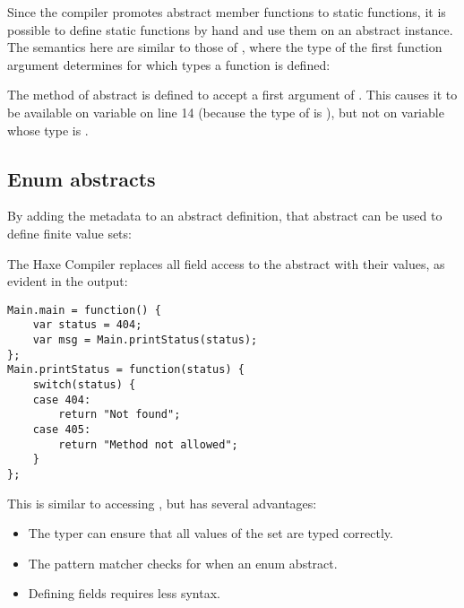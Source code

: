 Since the compiler promotes abstract member functions to static functions, it is possible to define static functions by hand and use them on an abstract instance. The semantics here are similar to those of , where the type of the first function argument determines for which types a function is defined:

The method  of abstract  is defined to accept a first argument of . This causes it to be available on variable  on line 14 (because the type of  is ), but not on variable  whose type is .



\subsection{Enum abstracts}
\label{types-abstract-enum}

By adding the  metadata to an abstract definition, that abstract can be used to define finite value sets:


The Haxe Compiler replaces all field access to the  abstract with their values, as evident in the  output:

\begin{lstlisting}
Main.main = function() {
	var status = 404;
	var msg = Main.printStatus(status);
};
Main.printStatus = function(status) {
	switch(status) {
	case 404:
		return "Not found";
	case 405:
		return "Method not allowed";
	}
};
\end{lstlisting}

This is similar to accessing , but has several advantages:

\begin{itemize}
	\item The typer can ensure that all values of the set are typed correctly.
	\item The pattern matcher checks for  when  an enum abstract.
	\item Defining fields requires less syntax.
\end{itemize}


